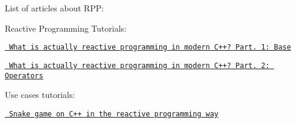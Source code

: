 List of articles about RPP\+:

Reactive Programming Tutorials\+:
\begin{DoxyItemize}
\item \href{https://medium.com/@victimsnino/what-is-actually-reactive-programming-in-modern-c-part-1-base-929355ac2901?source=friends_link&sk=59986e68b0688469c65ca0c757bbfd89}{\texttt{ What is actually reactive programming in modern C++? Part. 1\+: Base}}
\item \href{https://itnext.io/what-is-actually-reactive-programming-in-modern-c-part-2-operators-63d5ea7223cc?source=friends_link&sk=73cc7b8928d2944569e07f402d43d123}{\texttt{ What is actually reactive programming in modern C++? Part. 2\+: Operators}}
\end{DoxyItemize}

Use cases tutorials\+:
\begin{DoxyItemize}
\item \href{https://medium.com/@victimsnino/snake-game-on-c-in-the-reactive-programming-way-19310a73923a?source=friends_link&sk=608039f66da373d4f81c806ffe58298c}{\texttt{ Snake game on C++ in the reactive programming way}} 
\end{DoxyItemize}